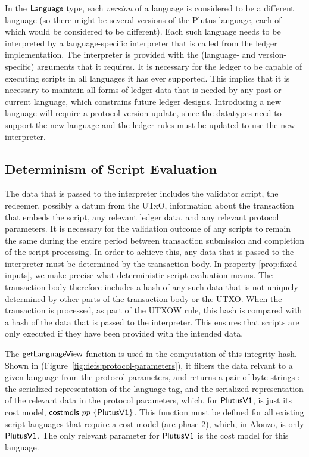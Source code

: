 In the $\mathsf{Language}$ type, each \emph{version} of a language is considered to be a different language (so there might be several versions of the Plutus language, each of which would be considered to
be different).
Each such language needs to be interpreted by a language-specific interpreter that is called from the ledger implementation.
The interpreter is provided with the (language- and version-specific) arguments that it requires.
It is necessary for the ledger to be capable of executing scripts in all languages it has ever supported.
This implies that it is necessary to maintain all forms of ledger
data that is needed by any past or current language, which constrains future ledger designs.
Introducing a new language will require a protocol version update, since the datatypes need to support the new language and the ledger rules must be updated to use the new interpreter.

\subsection{Determinism of Script Evaluation}
\label{sec:determinism}

The data that is passed to the interpreter
includes the validator script, the redeemer, possibly a datum from the UTxO, information about the transaction that
embeds the script, any relevant ledger data, and any relevant protocol parameters.
It is necessary for the validation outcome of any scripts to remain the same during the entire
period between transaction
submission and completion of the script processing.
%
In order to achieve this,
any data that is passed to the interpreter must be determined by the transaction body.
In property \ref{prop:fixed-inputs}, we make precise what deterministic script evaluation means.
The transaction body therefore includes a hash of any such data that is not uniquely determined by other parts of the transaction body or the UTXO.
When the transaction is processed, as part of the UTXOW rule, this hash is compared with a hash of the data that is passed to the interpreter. This
ensures that scripts are only executed if they have been provided with the intended data.

The $\mathsf{getLanguageView}$ function is used in the computation of this integrity hash.
Shown in (Figure~\ref{fig:defs:protocol-parameters}), it filters the data relvant
to a given language from the protocol parameters, and returns a pair of byte strings :
the serialized representation of
the language tag, and the serialized representation of the relevant data in the protocol
parameters, which, for
$\mathsf{PlutusV1}$, is just its cost model, $\mathsf{costmdls}~{pp}~\{\mathsf{PlutusV1}\}$.
This function must be defined for all
existing script languages that require a cost model (are phase-2), which, in Alonzo, is only $\mathsf{PlutusV1}$.
The only relevant parameter for $\mathsf{PlutusV1}$ is the cost model for this language.

